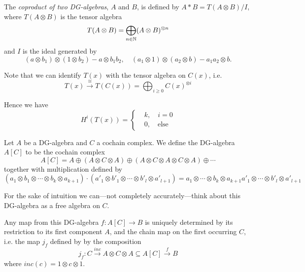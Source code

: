 The \emph{coproduct of two DG-algebras}, $A$ and $B$, is defined by $A\ast B = T(A\otimes B)/I$, where $T(A\otimes B)$ is the tensor algebra
\begin{equation*}
    T(A\otimes B) = \bigoplus_{n \in \mathbb{N}}(A\otimes B)^{\otimes n}
\end{equation*}
and $I$ is the ideal generated by 
\begin{equation*}
	(a\otimes b_1)\otimes (1\otimes b_2) - a\otimes b_1 b_2, \quad (a_1\otimes 1)\otimes (a_2 \otimes b) - a_1 a_2 \otimes b.
\end{equation*}

Note that we can identify $T(x)$ with the tensor algebra on $C(x)$, i.e. 
\begin{equation*}
    T(x) \overset{\cong}\longrightarrow T(C(x)) = \bigoplus_{i\geq 0}C(x)^{\otimes i}
\end{equation*}

Hence we have 
\begin{equation*}
H^i(T(x)) = 
\begin{cases}
    &k, \quad i=0 \\
    &0, \quad \text{else}
\end{cases}
\end{equation*}

\begin{definition}
Let $A$ be a DG-algebra and $C$ a cochain complex. We define the DG-algebra $A[C]$ to be the cochain complex
\begin{equation*}
    A[C] = A\oplus (A\otimes C\otimes A) \oplus (A\otimes C \otimes A \otimes C \otimes A) \oplus \cdots
\end{equation*}
together with multiplication defined by 
\begin{equation*}
    (a_1\otimes b_1 \otimes \cdots \otimes b_k \otimes a_{k+1}) \cdot (a'_1\otimes b'_1 \otimes \cdots \otimes b'_l \otimes a'_{l+1}) = a_1 \otimes \cdots \otimes b_k \otimes a_{k+1}a'_1 \otimes \cdots \otimes b'_l \otimes a'_{l+1}
\end{equation*}
\end{definition}

For the sake of intuition we can---not completely accurately---think about this DG-algebra as a free algebra on $C$.

Any map from this DG-algebra $f:A[C]\longrightarrow B$ is uniquely determined by its restriction to its first component $A$, and the chain map on the first occurring $C$, i.e. the map $j_f$ defined by by the composition
\begin{equation*}
    j_f: C\overset{inc}\longrightarrow A\otimes C\otimes A \subseteq A[C]\overset{f}\longrightarrow B
\end{equation*}
where $inc(c) = 1\otimes c \otimes 1$. 

